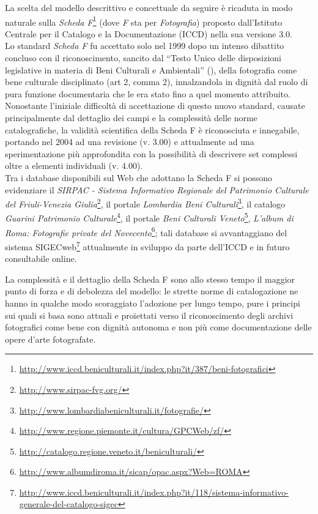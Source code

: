 La scelta del modello descrittivo e concettuale da seguire è ricaduta in modo naturale sulla \emph{Scheda F}\footnote{\url{http://www.iccd.beniculturali.it/index.php?it/387/beni-fotografici}} (dove \emph{F} sta per \emph{Fotografia}) proposto dall'Istituto Centrale per il Catalogo e la Documentazione (ICCD) nella sua versione 3.0.\\
Lo standard \emph{Scheda F} fu accettato solo nel 1999 dopo un intenso dibattito concluso con il riconoscimento, sancito dal ``Testo Unico delle disposizioni legislative in materia di Beni Culturali e Ambientali'' (\cite{16}), della fotografia come bene culturale disciplinato (art 2, comma 2), innalzandola in dignità dal ruolo di pura funzione documentaria che le era stato fino a quel momento attribuito.\\
Nonostante l'iniziale difficoltà di accettazione di questo nuovo standard, causate principalmente dal dettaglio dei campi e la complessità delle norme catalografiche, la validità scientifica della Scheda F è riconosciuta e innegabile, portando nel 2004 ad una revisione (v. 3.00) e attualmente ad una sperimentazione più approfondita con la possibilità di descrivere set complessi oltre a elementi individuali (v. 4.00).\\
Tra i database disponibili sul Web che adottano la Scheda F si possono evidenziare il \emph{SIRPAC - Sistema Informativo Regionale del Patrimonio Culturale del Friuli-Venezia Giulia}\footnote{\url{http://www.sirpac-fvg.org/}}, il portale \emph{Lombardia Beni Culturali}\footnote{\url{http://www.lombardiabeniculturali.it/fotografie/}}, il catalogo \emph{Guarini Patrimonio Culturale}\footnote{\url{http://www.regione.piemonte.it/cultura/GPCWeb/zf/}}, il portale \emph{Beni Culturali Veneto}\footnote{\url{http://catalogo.regione.veneto.it/beniculturali/}}, \emph{L'album di Roma: Fotografie private del Novecento}\footnote{\url{http://www.albumdiroma.it/sicap/opac.aspx?Web=ROMA}}; tali database si avvantaggiano del sistema SIGECweb\footnote{\url{http://www.iccd.beniculturali.it/index.php?it/118/sistema-informativo-generale-del-catalogo-sigec}} attualmente in sviluppo da parte dell'ICCD e in futuro consultabile online.

La complessità e il dettaglio della Scheda F sono allo stesso tempo il maggior punto di forza e di debolezza del modello: le strette norme di catalogazione ne hanno in qualche modo scoraggiato l'adozione per lungo tempo, pure i principi sui quali si basa sono attuali e proiettati verso il riconoscimento degli archivi fotografici come bene con dignità autonoma e non più come documentazione delle opere d'arte fotografate.

